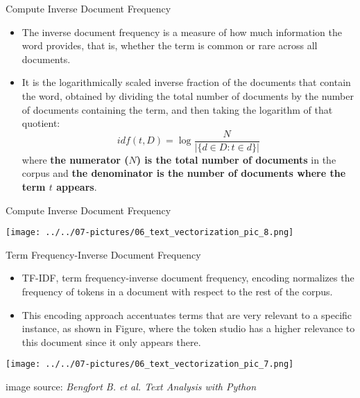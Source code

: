 \documentclass[11pt]{beamer}
\begin{document}
\begin{frame}{Compute Inverse Document Frequency}
	\begin{itemize}
		\item The inverse document frequency is a measure of how much information the word provides, that is, whether the term is common or rare across all documents. 
		\item It is the logarithmically scaled inverse fraction of the documents that contain the word, obtained by dividing the total number of documents by the number of documents containing the term, and then taking the logarithm of that quotient: 
		\begin{equation}idf(t,D) = \log \frac{N}{\vert \{  d \in D: t \in d\}\vert} 
		\end{equation}  
		where \textbf{the numerator ($N$) is the total number of documents} in the corpus and \textbf{the denominator is the number of documents where the term $t$ appears}.
	\end{itemize}
\end{frame}
\begin{frame}{Compute Inverse Document Frequency}
	\begin{center}
	\texttt{[image: ../../07-pictures/06\_text\_vectorization\_pic\_8.png]}
	\end{center}
\end{frame}
\begin{frame}{Term Frequency-Inverse Document Frequency }
	\begin{itemize}
		\item TF-IDF, term frequency-inverse document frequency, encoding normalizes the frequency of tokens in a document with respect to the rest of the corpus. 
		\item This encoding approach accentuates terms that are very relevant to a specific instance, as shown in Figure, where the token studio has a higher relevance to this document since it only appears there.
	\end{itemize}
	\begin{center}
	\texttt{[image: ../../07-pictures/06\_text\_vectorization\_pic\_7.png]}
	\end{center}
	\footnotesize{image source: \textit{Bengfort B. et al. Text Analysis with Python}}
\end{frame}
\end{document}
